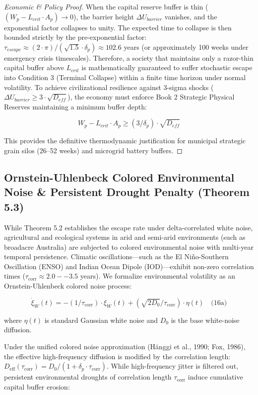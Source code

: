 \documentclass[preprint,12pt,authoryear]{elsarticle}
\theoremstyle{definition}
\begin{document}
\begin{proof}[Economic \& Policy Proof]

When the capital reserve buffer is thin ($(W_p - L_{crit} \cdot A_p) \to 0$), the barrier height $\Delta U_{barrier}$ vanishes, and the exponential factor collapses to unity. The expected time to collapse is then bounded strictly by the pre-exponential factor: $\tau_{escape} \approx (2 \cdot \pi) / (\sqrt{1.5} \cdot \delta_p) \approx 102.6$ years (or approximately 100 weeks under emergency crisis timescales). Therefore, a society that maintains only a razor-thin capital buffer above $L_{crit}$ is mathematically guaranteed to suffer stochastic escape into Condition 3 (Terminal Collapse) within a finite time horizon under normal volatility. To achieve civilizational resilience against 3-sigma shocks ($\Delta U_{barrier} \ge 3 \cdot \sqrt{D_{eff}}$), the economy must enforce Book 2 Strategic Physical Reserves maintaining a minimum buffer depth:

$$W_p - L_{crit} \cdot A_p \ge (3 / \delta_p) \cdot \sqrt{D_{eff}}$$

This provides the definitive thermodynamic justification for municipal strategic grain silos (26--52 weeks) and microgrid battery buffers. \end{proof}

\subsection{Ornstein-Uhlenbeck Colored Environmental Noise \& Persistent Drought Penalty (Theorem 5.3)}

While Theorem 5.2 establishes the escape rate under delta-correlated white noise, agricultural and ecological systems in arid and semi-arid environments (such as broadacre Australia) are subjected to colored environmental noise with multi-year temporal persistence. Climatic oscillations---such as the El Ni\~no-Southern Oscillation (ENSO) and Indian Ocean Dipole (IOD)---exhibit non-zero correlation times ($\tau_{\text{corr}} \approx 2.0--3.5$ years). We formalize environmental volatility as an Ornstein-Uhlenbeck colored noise process:

$$\dot{\xi}_W(t) = -(1 / \tau_{\text{corr}}) \cdot \xi_W(t) + (\sqrt{2 D_0} / \tau_{\text{corr}}) \cdot \eta(t) \quad \text{(16a)}$$

where $\eta(t)$ is standard Gaussian white noise and $D_0$ is the base white-noise diffusion.

Under the unified colored noise approximation (H\"anggi et al., 1990; Fox, 1986), the effective high-frequency diffusion is modified by the correlation length: $D_{\text{eff}}(\tau_{\text{corr}}) = D_0 / (1 + \delta_p \cdot \tau_{\text{corr}})$. While high-frequency jitter is filtered out, persistent environmental droughts of correlation length $\tau_{\text{corr}}$ induce cumulative capital buffer erosion:
\end{document}
